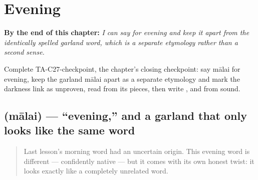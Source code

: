 
\chapter{Evening}
\label{ch:ta-evening}

\begin{chapteropening}
\textbf{By the end of this chapter:} \emph{I can say  for evening and keep it apart from the identically spelled garland word, which is a separate etymology rather than a second sense.}

Complete TA-C27-checkpoint, the chapter's closing checkpoint: say mālai for evening, keep the garland mālai apart as a separate etymology and mark the darkness link as unproven, read  from its pieces, then write ,  and  from sound.
\end{chapteropening}

\section[\texorpdfstring{\ta{மாலை} (mālai)}{மாலை (mālai)}]{ (mālai) — \textquotedblleft{}evening,\textquotedblright{} and a garland that only looks like the same word}

\label{lesson:TA-C27-maalai}



\begin{quote}
Last lesson's morning word had an uncertain origin. This evening word is different — confidently native — but it comes with its own honest twist: it looks exactly like a completely unrelated word.
\end{quote}

